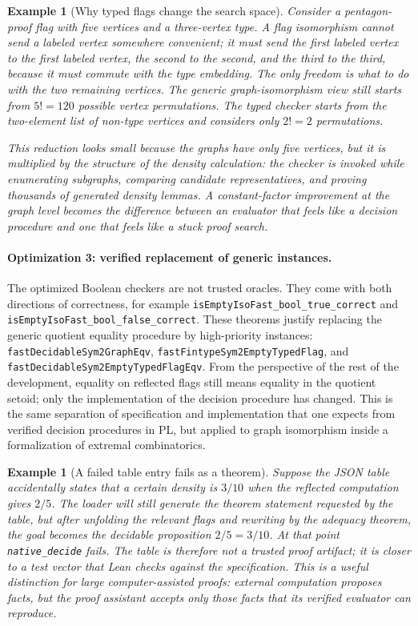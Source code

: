 \documentclass{article}
\newtheorem{example}[theorem]{Example}
\newcommand{\lean}[1]{\texttt{#1}}
\begin{document}
\begin{example}[Why typed flags change the search space]
  Consider a pentagon-proof flag with five vertices and a three-vertex type.
  A flag isomorphism cannot send a labeled vertex somewhere convenient; it must
  send the first labeled vertex to the first labeled vertex, the second to the
  second, and the third to the third, because it must commute with the type
  embedding.  The only freedom is what to do with the two remaining vertices.
  The generic graph-isomorphism view still starts from $5! = 120$ possible
  vertex permutations.  The typed checker starts from the two-element list of
  non-type vertices and considers only $2! = 2$ permutations.

  This reduction looks small because the graphs have only five vertices, but
  it is multiplied by the structure of the density calculation: the checker is
  invoked while enumerating subgraphs, comparing candidate representatives,
  and proving thousands of generated density lemmas.  A constant-factor
  improvement at the graph level becomes the difference between an evaluator
  that feels like a decision procedure and one that feels like a stuck proof
  search.
\end{example}

\paragraph{Optimization 3: verified replacement of generic instances.}
The optimized Boolean checkers are not trusted oracles.  They come with both
directions of correctness, for example
\lean{isEmptyIsoFast\_bool\_true\_correct} and
\lean{isEmptyIsoFast\_bool\_false\_correct}.  These theorems justify replacing
the generic quotient equality procedure by high-priority instances:
\lean{fastDecidableSym2GraphEqv},
\lean{fastFintypeSym2EmptyTypedFlag}, and
\lean{fastDecidableSym2EmptyTypedFlagEqv}.  From the perspective of the rest
of the development, equality on reflected flags still means equality in the
quotient setoid; only the implementation of the decision procedure has changed.
This is the same separation of specification and implementation that one
expects from verified decision procedures in PL, but applied to graph
isomorphism inside a formalization of extremal combinatorics.

\begin{example}[A failed table entry fails as a theorem]
  Suppose the JSON table accidentally states that a certain density is
  $3/10$ when the reflected computation gives $2/5$.  The loader will still
  generate the theorem statement requested by the table, but after unfolding
  the relevant flags and rewriting by the adequacy theorem, the goal becomes
  the decidable proposition $2/5 = 3/10$.  At that point
  \lean{native\_decide} fails.  The table is therefore not a trusted proof
  artifact; it is closer to a test vector that Lean checks against the
  specification.  This is a useful distinction for large computer-assisted
  proofs: external computation proposes facts, but the proof assistant accepts
  only those facts that its verified evaluator can reproduce.
\end{example}
\end{document}
